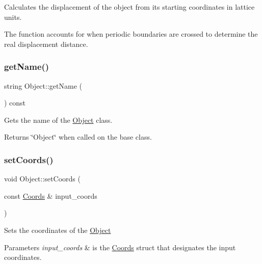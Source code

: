 Calculates the displacement of the object from its starting coordinates in lattice units. 

The function accounts for when periodic boundaries are crossed to determine the real displacement distance. \mbox{\label{class_object_ade517616d51cd9ab581ec5afeb37b313}} 
\subsubsection{\texorpdfstring{get\+Name()}{getName()}}
{\footnotesize\ttfamily string Object\+::get\+Name (\begin{DoxyParamCaption}{ }\end{DoxyParamCaption}) const\hspace{0.3cm}{\ttfamily [virtual]}}



Gets the name of the \hyperlink{class_object}{Object} class. 

\begin{DoxyReturn}{Returns}
\char`\"{}\+Object\char`\"{} when called on the base class. 
\end{DoxyReturn}
\mbox{\label{class_object_a34a164e4709e5daaba7a38c3d61ae617}} 
\subsubsection{\texorpdfstring{set\+Coords()}{setCoords()}}
{\footnotesize\ttfamily void Object\+::set\+Coords (\begin{DoxyParamCaption}\item[{const \hyperlink{struct_coords}{Coords} \&}]{input\+\_\+coords }\end{DoxyParamCaption})}

Sets the coordinates of the \hyperlink{class_object}{Object} 
\begin{DoxyParams}{Parameters}
{\em input\+\_\+coords} & is the \hyperlink{struct_coords}{Coords} struct that designates the input coordinates. \\
\hline
\end{DoxyParams}
\mbox{\label{class_object_ae39c4b0bd4e6a5f07f3d0e07e32061ec}} 
